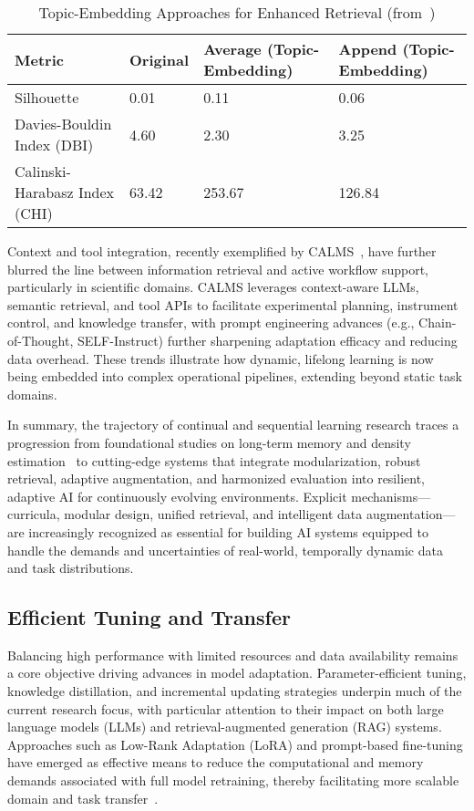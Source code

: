 \documentclass[sigconf]{acmart}
\begin{document}
\begin{table*}[htbp]
\centering
\caption{Topic-Embedding Approaches for Enhanced Retrieval (from~\cite{ref46})}
\label{tab:topic_embedding_retrieval}
\begin{adjustbox}{max width=\textwidth}
\begin{tabular}{@{}llll@{}}
\toprule
Metric & Original & Average (Topic-Embedding) & Append (Topic-Embedding) \\
\midrule
Silhouette & 0.01 & 0.11 & 0.06 \\
Davies-Bouldin Index (DBI) & 4.60 & 2.30 & 3.25 \\
Calinski-Harabasz Index (CHI) & 63.42 & 253.67 & 126.84 \\
\bottomrule
\end{tabular}
\end{adjustbox}
\end{table*}

Context and tool integration, recently exemplified by CALMS~\cite{ref30}, have further blurred the line between information retrieval and active workflow support, particularly in scientific domains. CALMS leverages context-aware LLMs, semantic retrieval, and tool APIs to facilitate experimental planning, instrument control, and knowledge transfer, with prompt engineering advances (e.g., Chain-of-Thought, SELF-Instruct) further sharpening adaptation efficacy and reducing data overhead. These trends illustrate how dynamic, lifelong learning is now being embedded into complex operational pipelines, extending beyond static task domains.

In summary, the trajectory of continual and sequential learning research traces a progression from foundational studies on long-term memory and density estimation~\cite{ref23,ref24} to cutting-edge systems that integrate modularization, robust retrieval, adaptive augmentation, and harmonized evaluation into resilient, adaptive AI for continuously evolving environments. Explicit mechanisms—curricula, modular design, unified retrieval, and intelligent data augmentation—are increasingly recognized as essential for building AI systems equipped to handle the demands and uncertainties of real-world, temporally dynamic data and task distributions.

\subsection{Efficient Tuning and Transfer}

Balancing high performance with limited resources and data availability remains a core objective driving advances in model adaptation. Parameter-efficient tuning, knowledge distillation, and incremental updating strategies underpin much of the current research focus, with particular attention to their impact on both large language models (LLMs) and retrieval-augmented generation (RAG) systems. Approaches such as Low-Rank Adaptation (LoRA) and prompt-based fine-tuning have emerged as effective means to reduce the computational and memory demands associated with full model retraining, thereby facilitating more scalable domain and task transfer~\cite{ref32, ref33, ref55, ref61}.
\end{document}
